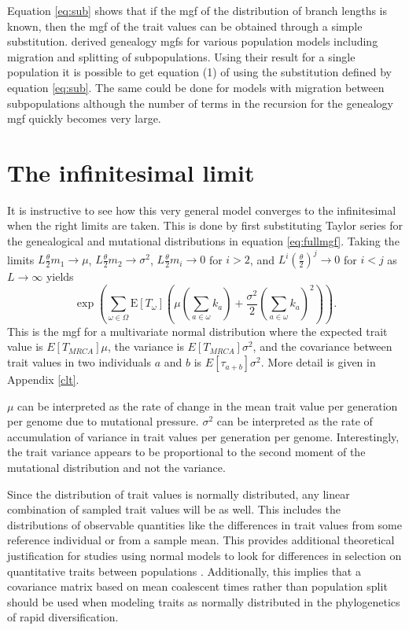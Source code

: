 \documentclass{article}
\newcommand{\T}{\frac{\theta}{2}}
\newcommand{\E}{\mathrm{E}}
\begin{document}
Equation \eqref{eq:sub} shows that if the mgf of the distribution of branch
lengths is known, then the mgf of the trait values can be obtained through a
simple substitution. \citet{Lohse2011} derived genealogy mgfs for various
population models including migration and splitting of subpopulations. Using
their result for a single population it is possible to get equation (1) of
\citet{Schraiber2015} using the substitution defined by equation \eqref{eq:sub}.
The same could be done for models with migration between subpopulations although
the number of terms in the recursion for the genealogy mgf quickly becomes very
large. 

\section{The infinitesimal limit}
It is instructive to see how this very general model converges to the
infinitesimal when the right limits are taken. This is done by first
substituting Taylor series for the genealogical and mutational distributions in
equation \eqref{eq:fullmgf}. Taking the limits $L\T m_1 \to \mu$,
$L\T m_2\to \sigma^2$, $L\T m_i\to 0$ for $i>2$, and
$L^i\left(\T\right)^j \to 0$ for $i<j$ as $L\to \infty$ yields
\begin{equation}
  \label{eq:clt}
  \exp \left( \sum_{\omega \in \Omega}\E[T_{\omega}] \left( \mu \left(
  \sum_{a \in \omega} k_a\right) + \frac{\sigma^2}{2}\left( \sum_{a \in \omega}
  k_a\right)^2\right)\right).
\end{equation}
This is the mgf for a multivariate normal distribution where the expected trait
value is $E[T_{MRCA}] \mu$, the variance is $E[T_{MRCA}]\sigma^2$, and the
covariance between trait values in two individuals $a$ and $b$ is
$E[\tau_{a+b}] \sigma^2$. More detail is given in Appendix \ref{clt}.

$\mu$ can be interpreted as the rate of change in the mean trait value per
generation per genome due to mutational pressure. $\sigma^2$ can be interpreted
as the rate of accumulation of variance in trait values per generation per
genome. Interestingly, the trait variance appears to be proportional to the
second moment of the mutational distribution and not the variance.

Since the distribution of trait values is normally distributed, any linear
combination of sampled trait values will be as well. This includes the
distributions of observable quantities like the differences in trait values from
some reference individual or from a sample mean. This provides additional
theoretical justification for studies using normal models to look for
differences in selection on quantitative traits between populations
\citep{Ovaskainen2011,Praebel2013,Berg2014,Robinson2015}. Additionally, this
implies that a covariance matrix based on mean coalescent times rather than
population split should be used when modeling traits as normally distributed in
the phylogenetics of rapid diversification.
\end{document}
